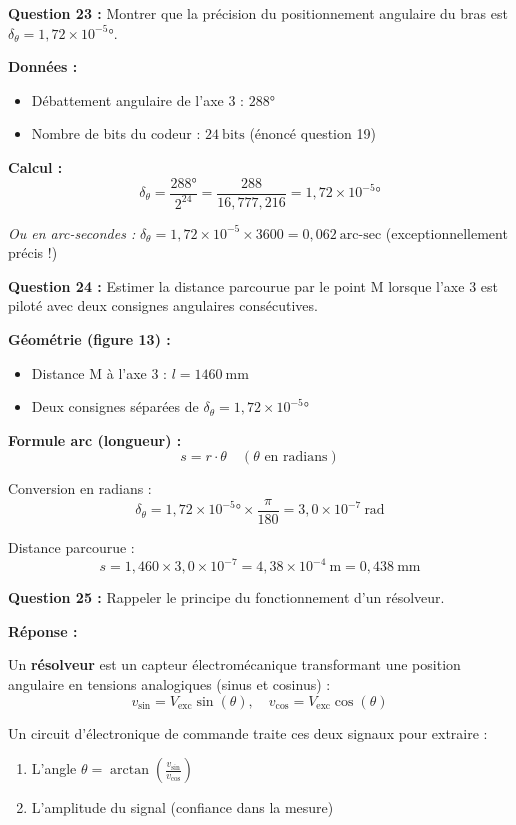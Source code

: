 \documentclass[12pt,a4paper,twoside]{article}
\begin{document}
\begin{correction}
  \textbf{Question 23 :} Montrer que la précision du positionnement angulaire du bras est $\delta_\theta = 1,72 \times 10^{-5}°$.

  \textbf{Données :}
  \begin{itemize}
    \item Débattement angulaire de l'axe 3 : $288°$
    \item Nombre de bits du codeur : $24~\text{bits}$ (énoncé question 19)
  \end{itemize}

  \textbf{Calcul :}
  \[
    \delta_\theta = \frac{288°}{2^{24}} = \frac{288}{16{,}777{,}216} = 1,72 \times 10^{-5}°
  \]

  \textit{Ou en arc-secondes :} $\delta_\theta = 1,72 \times 10^{-5} \times 3600 = 0,062~\text{arc-sec}$ (exceptionnellement précis !)

  \textbf{Question 24 :} Estimer la distance parcourue par le point M lorsque l'axe 3 est piloté avec deux consignes angulaires consécutives.

  \textbf{Géométrie (figure 13) :}
  \begin{itemize}
    \item Distance M à l'axe 3 : $l = 1460~\text{mm}$
    \item Deux consignes séparées de $\delta_\theta = 1,72 \times 10^{-5}°$
  \end{itemize}

  \textbf{Formule arc (longueur) :}
  \[
    s = r \cdot \theta \quad (\theta \text{ en radians})
  \]

  Conversion en radians :
  \[
    \delta_\theta = 1,72 \times 10^{-5}° \times \frac{\pi}{180} = 3,0 \times 10^{-7}~\text{rad}
  \]

  Distance parcourue :
  \[
    s = 1{,}460 \times 3,0 \times 10^{-7} = 4,38 \times 10^{-4}~\text{m} = 0,438~\text{mm}
  \]

  \textbf{Question 25 :} Rappeler le principe du fonctionnement d'un résolveur.

  \textbf{Réponse :}

  Un \textbf{résolveur} est un capteur électromécanique transformant une position angulaire en tensions analogiques (sinus et cosinus) :
  \[
    v_{\text{sin}} = V_{\text{exc}} \sin(\theta), \quad v_{\text{cos}} = V_{\text{exc}} \cos(\theta)
  \]

  Un circuit d'électronique de commande traite ces deux signaux pour extraire :
  \begin{enumerate}
    \item L'angle $\theta = \arctan\left(\frac{v_{\text{sin}}}{v_{\text{cos}}}\right)$
    \item L'amplitude du signal (confiance dans la mesure)
  \end{enumerate}


\end{correction}
\end{document}

